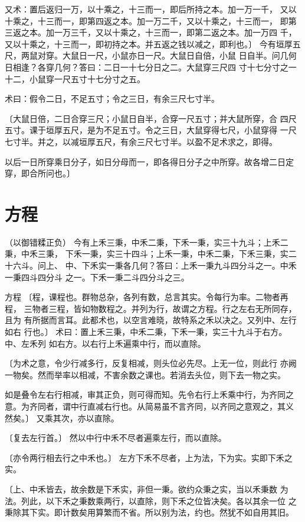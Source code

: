 \documentclass[a4paper,12pt,UTF8,twoside]{ctexbook}
\begin{document}
又术：置后返归一万，以十乘之，十三而一，即后所持之本。加一万一千， 又以十乘之，十三而一，即第四返之本。加一万二千，又以十乘之，十三而一， 即第三返之本。加一万三千，又以十乘之，十三而一，即第二返之本。加一万四 千，又以十乘之，十三而一，即初持之本。并五返之钱以减之，即利也。〕 今有垣厚五尺，两鼠对穿。大鼠日一尺，小鼠亦日一尺。大鼠日自倍，小鼠 日自半。问几何日相逢？各穿几何？答曰：二日一十七分日之二。大鼠穿三尺四 寸十七分寸之一十二，小鼠穿一尺五寸十七分寸之五。

术曰：假令二日，不足五寸；令之三日，有余三尺七寸半。

〔大鼠日倍，二日合穿三尺；小鼠日自半，合穿一尺五寸；并大鼠所穿，合 四尺五寸。课于垣厚五尺，是为不足五寸。令之三日，大鼠穿得七尺，小鼠穿得 一尺七寸半。并之，以减垣厚五尺，有余三尺七寸半。以盈不足术求之，即得。

以后一日所穿乘日分子，如日分母而一，即各得日分子之中所穿。故各增二日定 穿，即合所问也。〕

\chapter{方程}
（以御错糅正负） 今有上禾三秉，中禾二秉，下禾一秉，实三十九斗；上禾二秉，中禾三秉， 下禾一秉，实三十四斗；上禾一秉，中禾二秉，下禾三秉，实二十六斗。问上、 中、下禾实一秉各几何？答曰：上禾一秉九斗四分斗之一。中禾一秉四斗四分斗 之一。下禾一秉二斗四分斗之三。

方程 〔程，课程也。群物总杂，各列有数，总言其实。令每行为率。二物者再程， 三物者三程，皆如物数程之。并列为行，故谓之方程。行之左右无所同存，且为 有所据而言耳。此都术也，以空言难晓，故特系之禾以决之。又列中、左行如右 行也。〕 术曰：置上禾三秉，中禾二秉，下禾一秉，实三十九斗于右方。中、左禾列 如右方。以右行上禾遍乘中行，而以直除。

〔为术之意，令少行减多行，反复相减，则头位必先尽。上无一位，则此行 亦阙一物矣。然而举率以相减，不害余数之课也。若消去头位，则下去一物之实。

如是叠令左右行相减，审其正负，则可得而知。先令右行上禾乘中行，为齐同之 意。为齐同者，谓中行直减右行也。从简易虽不言齐同，以齐同之意观之，其义 然矣。〕 又乘其次，亦以直除。

〔复去左行首。〕 然以中行中禾不尽者遍乘左行，而以直除。

〔亦令两行相去行之中禾也。〕 左方下禾不尽者，上为法，下为实。实即下禾之实。

〔上、中禾皆去，故余数是下禾实，非但一秉。欲约众秉之实，当以禾秉数 为法。列此，以下禾之秉数乘两行，以直除，则下禾之位皆决矣。各以其余一位 之秉除其下实。即计数矣用算繁而不省。所以别为法，约也。然犹不如自用其旧。
\end{document}
